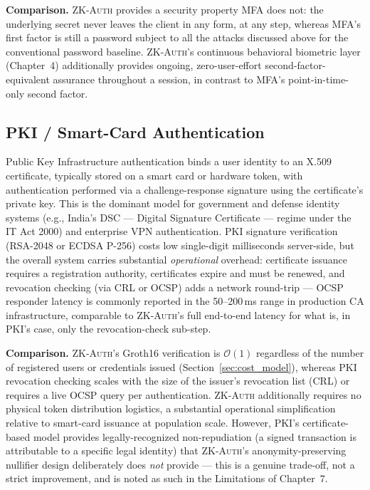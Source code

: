 \documentclass[12pt,a4paper,oneside]{report}
\begin{document}
\textbf{Comparison.} \textsc{ZK-Auth} provides a security property MFA
does not: the underlying secret never leaves the client in any form, at
any step, whereas MFA's first factor is still a password subject to all
the attacks discussed above for the conventional password baseline.
\textsc{ZK-Auth}'s continuous behavioral
biometric layer (Chapter~4) additionally provides ongoing,
zero-user-effort second-factor-equivalent assurance throughout a
session, in contrast to MFA's point-in-time-only second factor.

\subsection{PKI / Smart-Card Authentication}

Public Key Infrastructure authentication binds a user identity to an
X.509 certificate, typically stored on a smart card or hardware token,
with authentication performed via a challenge-response signature using
the certificate's private key. This is the dominant model for
government and defense identity systems (e.g., India's DSC --- Digital
Signature Certificate --- regime under the IT Act 2000) and enterprise
VPN authentication. PKI signature verification (RSA-2048 or ECDSA P-256)
costs low single-digit milliseconds server-side, but the overall system
carries substantial \textit{operational} overhead: certificate issuance
requires a registration authority, certificates expire and must be
renewed, and revocation checking (via CRL or OCSP) adds a network
round-trip --- OCSP responder latency is commonly reported in the
50--200\,ms range in production CA infrastructure, comparable to
\textsc{ZK-Auth}'s full end-to-end latency for what is, in PKI's case,
only the revocation-check sub-step.

\textbf{Comparison.} \textsc{ZK-Auth}'s Groth16 verification is
$\mathcal{O}(1)$ regardless of the number of registered users or
credentials issued (Section~\ref{sec:cost_model}), whereas PKI revocation checking scales
with the size of the issuer's revocation list (CRL) or requires a live
OCSP query per authentication. \textsc{ZK-Auth} additionally requires no
physical token distribution logistics, a substantial operational
simplification relative to smart-card issuance at population scale.
However, PKI's certificate-based model provides legally-recognized
non-repudiation (a signed transaction is attributable to a specific
legal identity) that \textsc{ZK-Auth}'s anonymity-preserving nullifier
design deliberately does \textit{not} provide --- this is a genuine
trade-off, not a strict improvement, and is noted as such in the
Limitations of Chapter~7.
\end{document}
